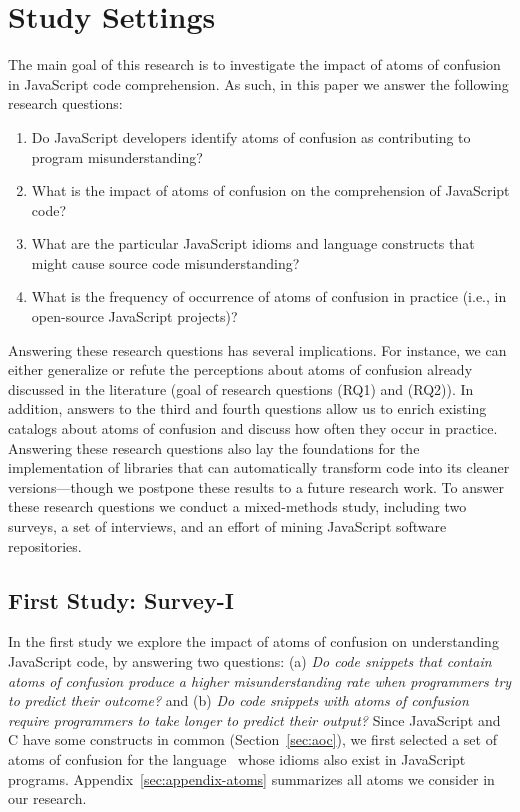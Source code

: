 \section{Study Settings}
\label{method}

The main goal of this research is to investigate the impact of atoms of confusion in JavaScript code comprehension. As such, in this paper we answer the following research questions: 

\begin{enumerate}[(RQ1)]
    \item Do JavaScript developers identify atoms of confusion as contributing to program misunderstanding? 
    \item What is the impact of atoms of confusion on the comprehension of JavaScript code? 
    \item What are the particular JavaScript idioms and language constructs that might cause source code misunderstanding?
    \item What is the frequency of occurrence of atoms of confusion in practice (i.e., in open-source JavaScript projects)?
\end{enumerate}

 
Answering these research questions has several implications. For instance, we can either generalize or refute the perceptions about atoms of confusion already discussed in the literature (goal of research questions (RQ1) and (RQ2)). In addition, answers to the third and fourth questions allow us to enrich existing catalogs about atoms of confusion and discuss how often they occur in practice. Answering these research questions also lay the foundations for the implementation of libraries that can automatically transform code into its cleaner versions---though we postpone these results to a future research work. To answer these research questions we conduct a mixed-methods study, including {\color{red}two surveys}, a set of interviews, and an effort of mining JavaScript software repositories.  


\subsection{First Study: Survey-I}



In the first study we explore the impact of atoms of confusion on
understanding JavaScript code, by answering two questions: (a) \emph{Do code snippets that contain atoms of confusion produce a higher misunderstanding rate when programmers try to predict their outcome?} and (b) \emph{Do code snippets with atoms of confusion require programmers to take longer to predict their output?}
Since JavaScript and C have some constructs in common (Section~\ref{sec:aoc}), we first selected a set of atoms of confusion for the \clang language~\cite{DBLP:conf/sigsoft/GopsteinIYDZYC17} whose idioms also exist in JavaScript programs. Appendix~\ref{sec:appendix-atoms} summarizes all atoms we consider in our research. 

